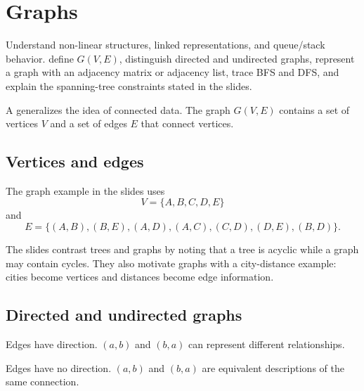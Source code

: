\chapter{Graphs}
\label{ch:graphs}

\chapterguide%
  {Understand non-linear structures, linked representations, and queue/stack behavior.}
  {define $G(V,E)$, distinguish directed and undirected graphs, represent a graph with an adjacency matrix or adjacency list, trace BFS and DFS, and explain the spanning-tree constraints stated in the slides.}

A  generalizes the idea of connected data. The graph $G(V,E)$ contains a set of vertices $V$ and a set of edges $E$ that connect vertices.

\section{Vertices and edges}

The graph example in the slides uses
\[
V=\{A,B,C,D,E\}
\]
and
\[
E=\{(A,B),(B,E),(A,D),(A,C),(C,D),(D,E),(B,D)\}.
\]

\begin{mlfigure}
\end{mlfigure}

The slides contrast trees and graphs by noting that a tree is acyclic while a graph may contain cycles. They also motivate graphs with a city-distance example: cities become vertices and distances become edge information.

\section{Directed and undirected graphs}

\begin{description}[leftmargin=1.4in,style=nextline]
  \item[Directed graph] Edges have direction. $(a,b)$ and $(b,a)$ can represent different relationships.
  \item[Undirected graph] Edges have no direction. $(a,b)$ and $(b,a)$ are equivalent descriptions of the same connection.
\end{description}

